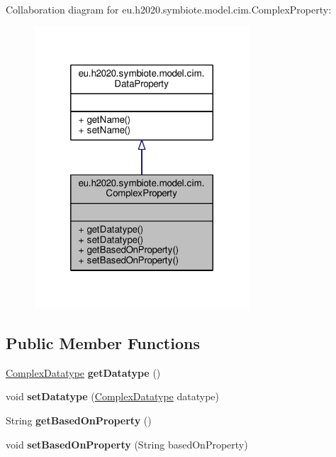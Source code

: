 Collaboration diagram for eu.\+h2020.\+symbiote.\+model.\+cim.\+Complex\+Property\+:\nopagebreak
\begin{figure}[H]
\begin{center}
\leavevmode
\includegraphics[width=228pt]{classeu_1_1h2020_1_1symbiote_1_1model_1_1cim_1_1ComplexProperty__coll__graph}
\end{center}
\end{figure}
\subsection*{Public Member Functions}
\begin{DoxyCompactItemize}
\item 
\mbox{\label{classeu_1_1h2020_1_1symbiote_1_1model_1_1cim_1_1ComplexProperty_a4809b1a0b0ac91673e0e84080cc0b40f}} 
\hyperlink{classeu_1_1h2020_1_1symbiote_1_1model_1_1cim_1_1ComplexDatatype}{Complex\+Datatype} {\bfseries get\+Datatype} ()
\item 
\mbox{\label{classeu_1_1h2020_1_1symbiote_1_1model_1_1cim_1_1ComplexProperty_aef0ccf992d5280f12c183f16c7dc9f23}} 
void {\bfseries set\+Datatype} (\hyperlink{classeu_1_1h2020_1_1symbiote_1_1model_1_1cim_1_1ComplexDatatype}{Complex\+Datatype} datatype)
\item 
\mbox{\label{classeu_1_1h2020_1_1symbiote_1_1model_1_1cim_1_1ComplexProperty_a98241ccbdee6c4fe35631c186e6cf5b6}} 
String {\bfseries get\+Based\+On\+Property} ()
\item 
\mbox{\label{classeu_1_1h2020_1_1symbiote_1_1model_1_1cim_1_1ComplexProperty_af948215819c802f7c356757c25339e37}} 
void {\bfseries set\+Based\+On\+Property} (String based\+On\+Property)
\end{DoxyCompactItemize}


